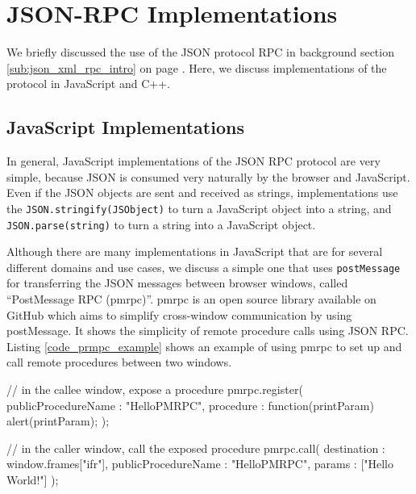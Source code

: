 


\section{JSON-RPC Implementations} %
We briefly discussed the use of the JSON protocol RPC in background section \ref{sub:json_xml_rpc_intro} on page \pageref{sub:json_xml_rpc_intro}. Here, we discuss implementations of the protocol in JavaScript and C++.
\label{sec:json_rpc_implementations}


\subsection{JavaScript Implementations} %
\label{sub:pmrpc_json_rpc_using_postmessage}

In general, JavaScript implementations of the JSON RPC protocol are very simple, because JSON is consumed very naturally by the browser and JavaScript. Even if the JSON objects are sent and received as strings, implementations use the \lstinline{JSON.stringify(JSObject)} to turn a JavaScript object into a string, and \lstinline{JSON.parse(string)} to turn a string into a JavaScript object.

Although there are many implementations in JavaScript that are for several different domains and use cases, we discuss a simple one that uses \lstinline{postMessage} for transferring the JSON messages between browser windows, called ``PostMessage RPC (pmrpc)''. pmrpc is an open source library available on GitHub\cite{pmrpc} which aims to simplify cross-window communication by using postMessage. It shows the simplicity of remote procedure calls using JSON RPC. Listing \ref{code_prmpc_example} shows an example of using pmrpc to set up and call remote procedures between two windows.

\begin{code}
// in the callee window, expose a procedure
pmrpc.register({
  publicProcedureName : "HelloPMRPC",
  procedure : function(printParam) { alert(printParam); } 
});

// in the caller window, call the exposed procedure
pmrpc.call({
  destination : window.frames["ifr"],
  publicProcedureName : "HelloPMRPC",
  params : ["Hello World!"]
});
\end{code}

